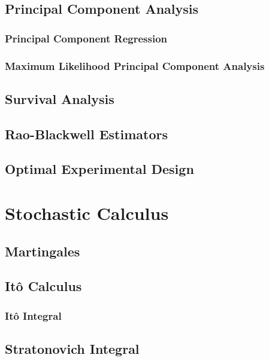 \documentclass[11pt]{report} %
\begin{document}
\section{Principal Component Analysis}

\subsection{Principal Component Regression}

\subsection{Maximum Likelihood Principal Component Analysis \cite{Bishop2006}}

\section{Survival Analysis}

\section{Rao-Blackwell Estimators}

\section{Optimal Experimental Design}

\chapter{Stochastic Calculus}

\section{Martingales}

\section{It\^{o} Calculus}

\subsection{It\^{o} Integral}

\section{Stratonovich Integral}
\end{document}
